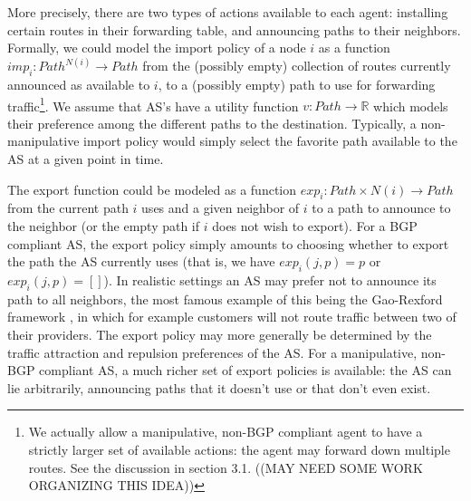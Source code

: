 \documentclass[10pt]{article}
\newcommand{\R}{\mathbb{R}}
\begin{document}
    More precisely, there are two types of actions available to each agent:
    installing certain routes in their forwarding table,
    and announcing paths to their neighbors.
    Formally, we could model the import policy of a node $i$ as a function
    $imp_i : Path^{N(i)} \to Path$ from the (possibly empty) collection of
    routes currently announced as available to $i$, to a (possibly empty) path
    to use for forwarding traffic\footnote{
      We actually allow a manipulative, non-BGP compliant agent to have a
      strictly larger set of available actions: the agent may forward down
      multiple routes. See the discussion in section 3.1. ((MAY NEED SOME WORK
      ORGANIZING THIS IDEA))
    }. We assume that AS's have a utility function $v : Path \to \R$
    which models their preference among the different paths to the destination.
    Typically, a non-manipulative import policy would simply select the favorite
    path available to the AS at a given point in time.

    The export function could be modeled as a function
    $exp_i : Path\times N(i) \to Path$ from the current path $i$ uses and a
    given neighbor of $i$ to a path to announce to the neighbor (or the empty
    path if $i$ does not wish to export).
    For a BGP compliant AS, the export policy simply amounts to choosing whether
    to export the path the AS currently uses (that is, we have $exp_i(j, p) = p$ or
    $exp_i(j, p) = []$).
    In realistic settings an AS may prefer not to announce its path to all
    neighbors, the most famous example of this being the Gao-Rexford framework
    \cite{GaoRexford}, in which for example customers will not route traffic
    between two of their providers.
    The export policy may more generally be determined by the traffic attraction
    and repulsion preferences of the AS.
    For a manipulative, non-BGP compliant AS,
    a much richer set of export policies is available:
    the AS can lie arbitrarily, announcing paths that it doesn't use
    or that don't even exist.


\end{document}
